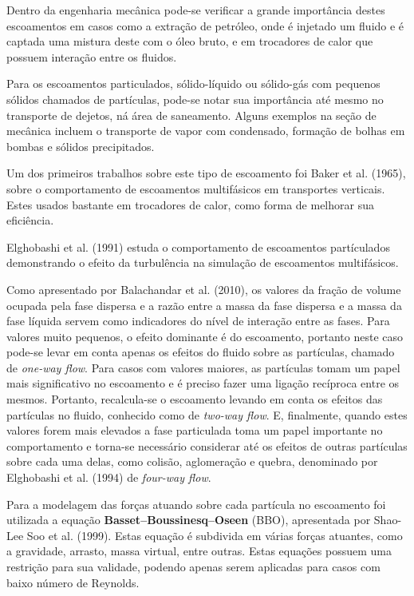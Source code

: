 Dentro da engenharia mecânica pode-se verificar a grande importância destes escoamentos em casos como a extração de petróleo, onde é injetado um fluido e é captada uma mistura deste com o óleo bruto, e em trocadores de calor que possuem interação entre os fluidos.

Para os escoamentos particulados, sólido-líquido ou sólido-gás com pequenos sólidos chamados de partículas, pode-se notar sua importância até mesmo no transporte de dejetos, ná área de saneamento.%
Alguns exemplos na seção de mecânica incluem o transporte de vapor com condensado, formação de bolhas em bombas e sólidos precipitados.

Um dos primeiros trabalhos sobre este tipo de escoamento foi Baker et al. (1965)\cite{Baker-1965}, sobre o comportamento de escoamentos multifásicos em transportes verticais.
Estes usados bastante em trocadores de calor, como forma de melhorar sua eficiência.

Elghobashi et al. (1991)\cite{Elghobashi-1991} estuda o comportamento de escoamentos partículados demonstrando o efeito da turbulência na simulação de escoamentos multifásicos.

Como apresentado por Balachandar et al. (2010)\cite{Balachandar-2010}, os valores da fração de volume ocupada pela fase dispersa e a razão entre a massa da fase dispersa e a massa da fase líquida servem como indicadores do nível de interação entre as fases.
Para valores muito pequenos, o efeito dominante é do escoamento, portanto neste caso pode-se levar em conta apenas os efeitos do fluido sobre as partículas, chamado de \textit{one-way flow}.
Para casos com valores maiores, as partículas tomam um papel mais significativo no escoamento e é preciso fazer uma ligação recíproca entre os mesmos.
Portanto, recalcula-se o escoamento levando em conta os efeitos das partículas no fluido, conhecido como de \textit{two-way flow}.
E, finalmente, quando estes valores forem mais elevados a fase particulada toma um papel importante no comportamento e torna-se necessário considerar até os efeitos de outras partículas sobre cada uma delas, como colisão, aglomeração e quebra, denominado por Elghobashi et al. (1994)\cite{Elghobashi-1994} de \textit{four-way flow}.

Para a modelagem das forças atuando sobre cada partícula no escoamento foi utilizada a equação \textbf{Basset–Boussinesq–Oseen} (BBO), apresentada por Shao-Lee Soo et al. (1999)\cite{ShaoLeeSoo-1999}.
Estas equação é subdivida em várias forças atuantes, como a gravidade, arrasto, massa virtual, entre outras.
Estas equações possuem uma restrição para sua validade, podendo apenas serem aplicadas para casos com baixo número de Reynolds.


